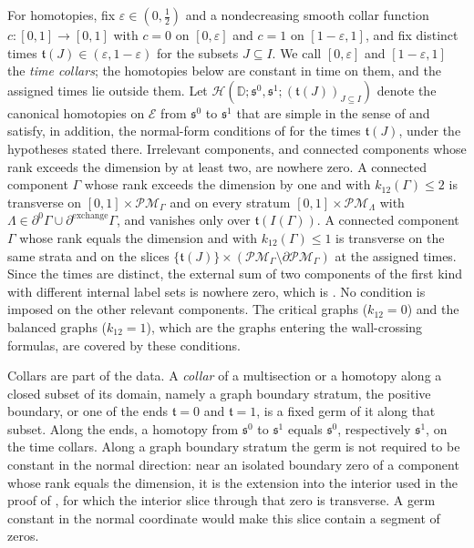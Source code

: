 For homotopies, fix $\varepsilon\in(0,\frac12)$ and a nondecreasing smooth collar function
$c:[0,1]\to[0,1]$ with $c=0$ on $[0,\varepsilon]$ and $c=1$ on
$[1-\varepsilon,1]$, and fix distinct times
$\mathfrak t(J)\in(\varepsilon,1-\varepsilon)$ for the subsets
$J\subseteq I$.  We call $[0,\varepsilon]$ and $[1-\varepsilon,1]$ the
\emph{time collars}; the homotopies below are constant in time on them, and
the assigned times lie outside them.  Let
$\mathcal H(\mathbb D;\mathfrak s^0,\mathfrak s^1;(\mathfrak t(J))_{J\subseteq
I})$ denote the canonical homotopies on $\mathcal E$ from $\mathfrak s^0$ to
$\mathfrak s^1$ that are simple in the sense of
\cite[Def.~3.36]{grossetal2022open} and satisfy, in addition, the
normal-form conditions of \cite[Lem.~3.40]{grossetal2022open} for the times
$\mathfrak t(J)$, under the hypotheses stated there.  Irrelevant components, and
connected components whose rank exceeds the dimension by at least two, are
nowhere zero.  A connected component $\Gamma$ whose rank exceeds the
dimension by one and with $k_{12}(\Gamma)\leq2$ is transverse on
$[0,1]\times\mathcal{PM}_\Gamma$ and on every stratum
$[0,1]\times\mathcal{PM}_\Lambda$ with
$\Lambda\in\partial^0\Gamma\cup\partial^{\mathrm{exchange}}\Gamma$, and
vanishes only over $\mathfrak t(I(\Gamma))$.  A connected component $\Gamma$
whose rank equals the dimension and with $k_{12}(\Gamma)\leq1$ is transverse
on the same strata and on the slices
$\{\mathfrak t(J)\}\times(\mathcal{PM}_\Gamma\setminus\partial\mathcal{PM}_\Gamma)$
at the assigned times.  Since the times are distinct, the external sum of two
components of the first kind with different internal label sets is nowhere
zero, which is \cite[Lem.~3.40(1)(c)]{grossetal2022open}.  No condition is imposed on the other relevant
components.  The critical graphs ($k_{12}=0$) and the balanced graphs
($k_{12}=1$), which are the graphs entering the wall-crossing formulas, are
covered by these conditions.

Collars are part of the data.  A \emph{collar} of a multisection or a
homotopy along a closed subset of its domain, namely a graph boundary
stratum, the positive boundary, or one of the ends $\mathfrak t=0$ and
$\mathfrak t=1$, is a fixed germ of it along that subset.  Along the ends, a
homotopy from $\mathfrak s^0$ to $\mathfrak s^1$ equals $\mathfrak s^0$,
respectively $\mathfrak s^1$, on the time collars.  Along a graph boundary
stratum the germ is not required to be constant in the normal direction:
near an isolated boundary zero of a component whose rank equals the
dimension, it is the extension into the interior used in the proof of
\cite[Lem.~3.40(3)(b)]{grossetal2022open}, for which the interior slice
through that zero is transverse.  A germ constant in the normal coordinate
would make this slice contain a segment of zeros.

